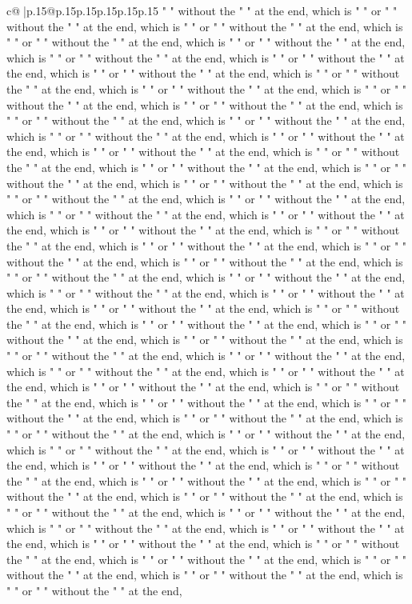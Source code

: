 \documentclass{article}
\begin{document}
{\begin{supertabular}{c@{$\;$}|p{.15\linewidth}@{}p{.15\linewidth}p{.15\linewidth}p{.15\linewidth}p{.15\linewidth}p{.15\linewidth}}
{{{" " without the " " at the end, which is " " or " " without the " " at the end, which is " " or " " without the " " at the end, which is " " or " " without the " " at the end, which is " " or " " without the " " at the end, which is " " or " " without the " " at the end, which is " " or " " without the " " at the end, which is " " or " " without the " " at the end, which is " " or " " without the " " at the end, which is " " or " " without the " " at the end, which is " " or " " without the " " at the end, which is " " or " " without the " " at the end, which is " " or " " without the " " at the end, which is " " or " " without the " " at the end, which is " " or " " without the " " at the end, which is " " or " " without the " " at the end, which is " " or " " without the " " at the end, which is " " or " " without the " " at the end, which is " " or " " without the " " at the end, which is " " or " " without the " " at the end, which is " " or " " without the " " at the end, which is " " or " " without the " " at the end, which is " " or " " without the " " at the end, which is " " or " " without the " " at the end, which is " " or " " without the " " at the end, which is " " or " " without the " " at the end, which is " " or " " without the " " at the end, which is " " or " " without the " " at the end, which is " " or " " without the " " at the end, which is " " or " " without the " " at the end, which is " " or " " without the " " at the end, which is " " or " " without the " " at the end, which is " " or " " without the " " at the end, which is " " or " " without the " " at the end, which is " " or " " without the " " at the end, which is " " or " " without the " " at the end, which is " " or " " without the " " at the end, which is " " or " " without the " " at the end, which is " " or " " without the " " at the end, which is " " or " " without the " " at the end, which is " " or " " without the " " at the end, which is " " or " " without the " " at the end, which is " " or " " without the " " at the end, which is " " or " " without the " " at the end, which is " " or " " without the " " at the end, which is " " or " " without the " " at the end, which is " " or " " without the " " at the end, which is " " or " " without the " " at the end, which is " " or " " without the " " at the end, which is " " or " " without the " " at the end, which is " " or " " without the " " at the end, which is " " or " " without the " " at the end, which is " " or " " without the " " at the end, which is " " or " " without the " " at the end, which is " " or " " without the " " at the end, which is " " or " " without the " " at the end, which is " " or " " without the " " at the end, which is " " or " " without the " " at the end, which is " " or " " without the " " at the end, which is " " or " " without the " " at the end, which is " " or " " without the " " at the end, which is " " or " " without the " " at the end, which is " " or " " without the " " at the end, which is " " or " " without the " " at the end, which is " " or " " without the " " at the end, which is " " or " " without the " " at the end, which is " " or " " without the " " at the end, }}}
\end{supertabular}}
\end{document}
